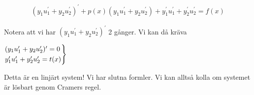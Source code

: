 \begin{equation*}
  \begin{gathered}
    (y_1u_1^{\prime}+y_2u_2^{\prime})^{\prime} + p(x)(y_1u_1^{\prime}+y_2u_2^{\prime})+y_1^{\prime}u_1^{\prime}+y_2^{\prime}u_2^{\prime} = f(x)
  \end{gathered}
\end{equation*}
\par\bigskip
\noindent Notera att vi har $(y_1u_1^{\prime}+y_2u_2^{\prime})^{\prime}$ 2 gånger. Vi kan då kräva
\par\bigskip
$
\begin{rcases*}
  (y_1u_1^{\prime}+y_2u_2^{\prime})^{\prime} = 0\\
  y_1^{\prime}u_1^{\prime}+y_2^{\prime}u_2^{\prime} = t(x)
\end{rcases*}$
\par\bigskip
\noindent Detta är en linjärt system! Vi har slutna formler. Vi kan alltså kolla om systemet är lösbart genom Cramers regel. 






